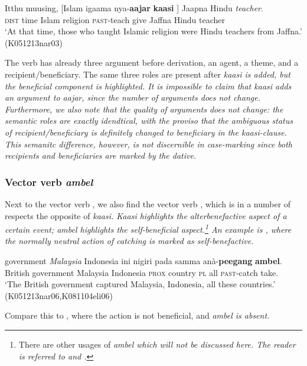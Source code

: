 \documentclass[a4paper,10pt]{article}
\begin{document}
\ea\label{ex:valencychange:kaasi:aajar}
\gll Itthu muusing,  [Islam igaama  nya-\textbf{aajar} \textbf{kaasi} \zero{}] Jaapna  Hindu {\em teacher}. \\
      \textsc{dist} time Islam religion \textsc{past}-teach give { } Jaffna Hindu teacher \\
    `At that time, those who taught Islamic religion were Hindu teachers from Jaffna.' (K051213nar03)
\z

The verb  has already three argument before derivation, an agent, a theme, and a recipient/beneficiary. The same three roles are present after \em kaasi \em is added, but the beneficial component is highlighted. It is impossible to claim that \em kaasi \em adds an argument to \em aajar\em, since the number of arguments does not change. Furthermore, we also note that the quality of arguments does not change: the semantic roles are exactly idendtical, with the proviso that the ambiguous status of recipient/beneficiary is definitely changed to beneficiary in the \em kaasi\em-clause. This semanitc difference, however, is not discernible in case-marking since both recipients and beneficiaries are marked by the dative.


\subsubsection{Vector verb \em ambel\em}
Next to the vector verb , we also find the vector verb , which is in a number of respects the opposite of \em kaasi\em. \em Kaasi \em highlights the alterbenefactive aspect of a certain event; \em ambel \em highlights the self-beneficial aspect.\footnote{There
  are other usages of \em ambel \em which will not be discussed here. The reader is referred to \citet{Nordhoff2009phd} and \citet{Nordhofffcsvc}.}
An example  is , where the normally neutral action of catching is marked as self-benefactive. 

\ea\label{ex:vector:ambel:ambel}
 government {\em Malaysia} Indonesia ini nigiri pada samma anà-\textbf{peegang} \textbf{ambel}. \\
     British government Malaysia Indonesia \textsc{prox} country \textsc{pl} all \textsc{past}-catch take. \\
    `The British government captured Malaysia, Indonesia, all these countries.' (K051213nar06,K081104eli06)%
\z

Compare this to , where the action is not beneficial, and \em ambel \em is absent.
\end{document}
